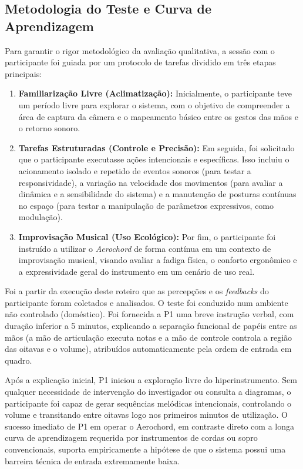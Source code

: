 \subsection{Metodologia do Teste e Curva de Aprendizagem}

Para garantir o rigor metodológico da avaliação qualitativa, a sessão com o participante foi guiada por um protocolo de tarefas dividido em três etapas principais:
\begin{enumerate}
    \item \textbf{Familiarização Livre (Aclimatização):} Inicialmente, o participante teve um período livre para explorar o sistema, com o objetivo de compreender a área de captura da câmera e o mapeamento básico entre os gestos das mãos e o retorno sonoro.
    \item \textbf{Tarefas Estruturadas (Controle e Precisão):} Em seguida, foi solicitado que o participante executasse ações intencionais e específicas. Isso incluiu o acionamento isolado e repetido de eventos sonoros (para testar a responsividade), a variação na velocidade dos movimentos (para avaliar a dinâmica e a sensibilidade do sistema) e a manutenção de posturas contínuas no espaço (para testar a manipulação de parâmetros expressivos, como modulação).
    \item \textbf{Improvisação Musical (Uso Ecológico):} Por fim, o participante foi instruído a utilizar o \textit{Aerochord} de forma contínua em um contexto de improvisação musical, visando avaliar a fadiga física, o conforto ergonômico e a expressividade geral do instrumento em um cenário de uso real.
\end{enumerate}

Foi a partir da execução deste roteiro que as percepções e os \textit{feedbacks} do participante foram coletados e analisados. O teste foi conduzido num ambiente não controlado (doméstico). Foi fornecida a P1 uma breve instrução verbal, com duração inferior a 5 minutos, explicando a separação funcional de papéis entre as mãos (a mão de articulação executa notas e a mão de controle controla a região das oitavas e o volume), atribuídos automaticamente pela ordem de entrada em quadro.

Após a explicação inicial, P1 iniciou a exploração livre do hiperinstrumento. Sem qualquer necessidade de intervenção do investigador ou consulta a diagramas, o participante foi capaz de gerar sequências melódicas intencionais, controlando o volume e transitando entre oitavas logo nos primeiros minutos de utilização. O sucesso imediato de P1 em operar o Aerochord, em contraste direto com a longa curva de aprendizagem requerida por instrumentos de cordas ou sopro convencionais, suporta empiricamente a hipótese de que o sistema possui uma barreira técnica de entrada extremamente baixa.

